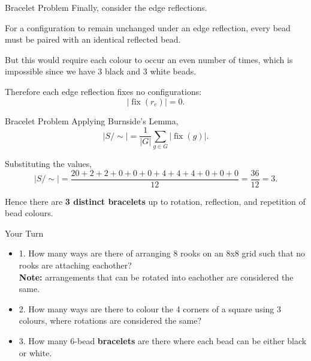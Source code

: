 \begin{frame}{Bracelet Problem}
  Finally, consider the edge reflections.

  \vspace{0.5em}

  For a configuration to remain unchanged under an edge reflection, every bead must be paired with an identical reflected bead.

  \vspace{0.5em}

  But this would require each colour to occur an even number of times, which is impossible since we have 3 black and 3 white beads.

  \vspace{0.5em}

  Therefore each edge reflection fixes no configurations:
  \[
    |\operatorname{fix}(r_e)| = 0.
  \]
\end{frame}

\begin{frame}{Bracelet Problem}
  Applying Burnside's Lemma,
  \[
    |S/\sim|
    =
    \frac{1}{|G|}
    \sum_{g \in G} |\operatorname{fix}(g)|.
  \]

  Substituting the values,
  \[
    |S/\sim|
    =
    \frac{20 + 2 + 2 + 0 + 0 + 0 + 4 + 4 + 4 + 0 + 0 + 0}{12}
    = \frac{36}{12}
    = 3.
  \]

  Hence there are \textbf{3 distinct bracelets} up to rotation, reflection, and repetition of bead colours.
\end{frame}

\begin{frame}{Your Turn}



  \begin{itemize}
    \item 1. How many ways are there of arranging 8 rooks on an 8x8 grid such that no rooks are attaching eachother?\\
          \textbf{Note:} arrangements that can be rotated into eachother are considered the same.\\
    \item 2. How many ways are there to colour the 4 corners of a square using 3 colours, where rotations are considered the same?\\
    \item 3. How many 6-bead \textbf{bracelets} are there where each bead can be either black or white.\\

  \end{itemize}

\end{frame}

